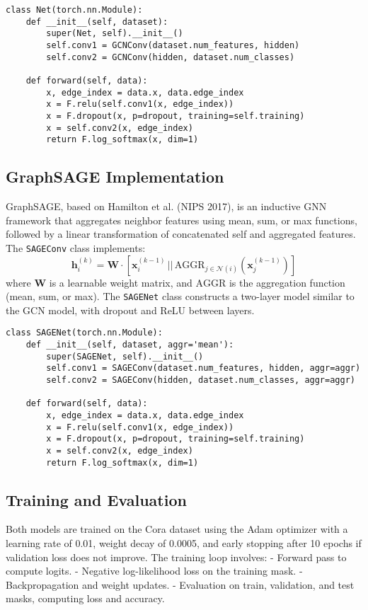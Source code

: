 \documentclass{article}
\begin{document}
\begin{lstlisting}
class Net(torch.nn.Module):
    def __init__(self, dataset):
        super(Net, self).__init__()
        self.conv1 = GCNConv(dataset.num_features, hidden)
        self.conv2 = GCNConv(hidden, dataset.num_classes)

    def forward(self, data):
        x, edge_index = data.x, data.edge_index
        x = F.relu(self.conv1(x, edge_index))
        x = F.dropout(x, p=dropout, training=self.training)
        x = self.conv2(x, edge_index)
        return F.log_softmax(x, dim=1)
\end{lstlisting}

\subsection*{GraphSAGE Implementation}
GraphSAGE, based on Hamilton et al. (NIPS 2017), is an inductive GNN framework that aggregates neighbor features using mean, sum, or max functions, followed by a linear transformation of concatenated self and aggregated features. The \texttt{SAGEConv} class implements:
\[
\mathbf{h}_i^{(k)} = \mathbf{W} \cdot \left[ \mathbf{x}_i^{(k-1)} \, || \, \mathrm{AGGR}_{j \in \mathcal{N}(i)} \left( \mathbf{x}_j^{(k-1)} \right) \right]
\]
where \(\mathbf{W}\) is a learnable weight matrix, and \(\mathrm{AGGR}\) is the aggregation function (mean, sum, or max). The \texttt{SAGENet} class constructs a two-layer model similar to the GCN model, with dropout and ReLU between layers.

\begin{lstlisting}
class SAGENet(torch.nn.Module):
    def __init__(self, dataset, aggr='mean'):
        super(SAGENet, self).__init__()
        self.conv1 = SAGEConv(dataset.num_features, hidden, aggr=aggr)
        self.conv2 = SAGEConv(hidden, dataset.num_classes, aggr=aggr)

    def forward(self, data):
        x, edge_index = data.x, data.edge_index
        x = F.relu(self.conv1(x, edge_index))
        x = F.dropout(x, p=dropout, training=self.training)
        x = self.conv2(x, edge_index)
        return F.log_softmax(x, dim=1)
\end{lstlisting}

\subsection*{Training and Evaluation}
Both models are trained on the Cora dataset using the Adam optimizer with a learning rate of 0.01, weight decay of 0.0005, and early stopping after 10 epochs if validation loss does not improve. The training loop involves:
- Forward pass to compute logits.
- Negative log-likelihood loss on the training mask.
- Backpropagation and weight updates.
- Evaluation on train, validation, and test masks, computing loss and accuracy.
\end{document}
